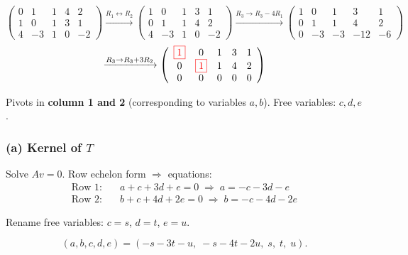\documentclass[a4paper,12pt]{article}
\newcommand{\piv}[1]{{\color{red}\boxed{#1}}}
\begin{document}
\[
\left(\begin{array}{ccccc}
0 & 1 & 1 & 4 & 2 \\
1 & 0 & 1 & 3 & 1 \\
4 & -3 & 1 & 0 & -2
\end{array}\right)
\xrightarrow{R_1 \leftrightarrow R_2}
\left(\begin{array}{ccccc}
1 & 0 & 1 & 3 & 1 \\
0 & 1 & 1 & 4 & 2 \\
4 & -3 & 1 & 0 & -2
\end{array}\right)
\xrightarrow{R_3 \to R_3 - 4R_1}
\left(\begin{array}{ccccc}
1 & 0 & 1 & 3 & 1 \\
0 & 1 & 1 & 4 & 2 \\
0 & -3 & -3 & -12 & -6
\end{array}\right)
\]
\[
\xrightarrow{R_3 \to R_3 + 3R_2}
\left(\begin{array}{ccccc}
\piv{1} & 0 & 1 & 3 & 1 \\
0 & \piv{1} & 1 & 4 & 2 \\
0 & 0 & 0 & 0 & 0
\end{array}\right)
\]

Pivots in \textbf{column 1 and 2} (corresponding to variables $a, b$). Free variables: $c, d, e$.

\subsubsection*{(a) Kernel of $T$}

Solve $Av = 0$. Row echelon form $\Rightarrow$ equations:
\begin{align*}
\text{Row 1:} &\quad a + c + 3d + e = 0 \;\Rightarrow\; a = -c - 3d - e \\
\text{Row 2:} &\quad b + c + 4d + 2e = 0 \;\Rightarrow\; b = -c - 4d - 2e
\end{align*}

Rename free variables: $c = s$, $d = t$, $e = u$.

\[
(a, b, c, d, e) = (-s - 3t - u,\; -s - 4t - 2u,\; s,\; t,\; u).
\]
\end{document}
